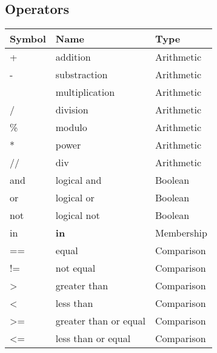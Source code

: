 \documentclass[5pt]{article}
\begin{document}
\begin{multicols}{2}
\subsection{Operators}
\begin{tabular}{|>{\ttfamily}l|l|l|}
    \hline
    Symbol  &   Name                    & Type       \\
    \hline
    +       & addition                  & Arithmetic \\
    -       & substraction              & Arithmetic \\
    *       & multiplication            & Arithmetic \\
    /       & division                  & Arithmetic \\
    \%      & modulo                    & Arithmetic \\
    **      & power                     & Arithmetic \\
    //      & div                       & Arithmetic \\
    and     & logical and               & Boolean    \\
    or      & logical or                & Boolean    \\
    not     & logical not               & Boolean    \\
    in      & \textbf{in}               & Membership \\
    ==      & equal                     & Comparison \\
    !=      & not equal                 & Comparison \\
    >       & greater than              & Comparison \\
    <       & less than                 & Comparison \\
    >=      & greater than or equal     & Comparison \\
    <=      & less than or equal        & Comparison \\
    \hline
\end{tabular}



\end{multicols}
\end{document}
